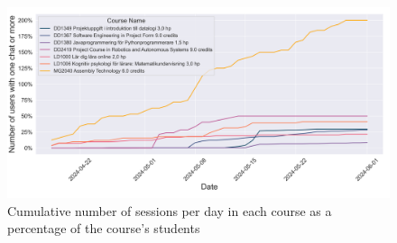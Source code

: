 \begin{figure}[H]
    \centering
    \includegraphics[width=\textwidth]{results/plots/assets/usage-07-number-of-sessions-per-day-and-course.png}
    \caption{Cumulative number of sessions per day in each course as a percentage of the course's students}
    \label{fig:usage_07_number_of_sessions_per_day_and_course}
\end{figure}